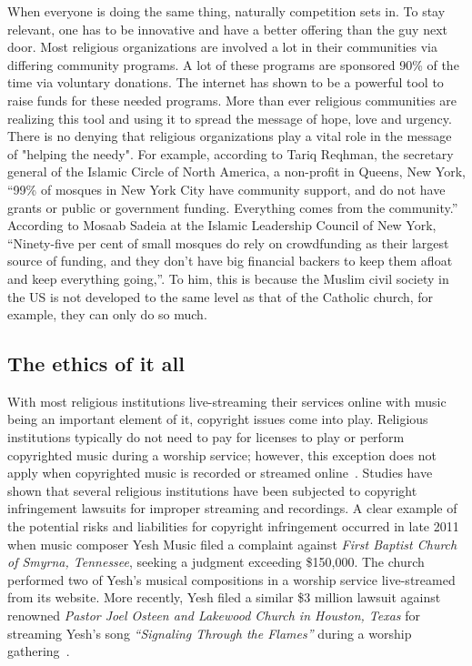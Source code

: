 When everyone is doing the same thing, naturally competition sets in. To stay relevant, one has to be innovative and have a better offering than the guy next door. Most religious organizations are involved a lot in their communities via differing community programs. A lot of these programs are sponsored 90\% of the time via voluntary donations. The internet has shown to be a powerful tool to raise funds for these needed programs. More than ever religious communities are realizing this tool and using it to spread the message of hope, love and urgency. There is no denying that religious organizations play a vital role in the message of "helping the needy". For example, according to Tariq Reqhman, the secretary general of the Islamic Circle of North America, a non-profit in Queens, New York, “99\% of mosques in New York City have community support, and do not have grants or public or government funding. Everything comes from the community.”~\cite{mulvey} According to Mosaab Sadeia at the Islamic Leadership Council of New York, “Ninety-five per cent of small mosques do rely on crowdfunding as their largest source of funding, and they don’t have big financial backers to keep them afloat and keep everything going,”. To him, this is because the Muslim civil society in the US is not developed to the same level as that of the Catholic church, for example, they can only do so much.

\subsection{The ethics of it all}
With most religious institutions live-streaming their services online with music being an important element of it, copyright issues come into play. Religious institutions typically do not need to pay for licenses to play or perform copyrighted music during a worship service; however, this exception does not apply when copyrighted music is recorded or streamed online~\cite{dickson}. Studies have shown that several religious institutions have been subjected to copyright infringement lawsuits for improper streaming and recordings. A clear example of the potential risks and liabilities for copyright infringement occurred in late 2011 when music composer Yesh Music filed a complaint against \textit{First Baptist Church of Smyrna, Tennessee}, seeking a judgment exceeding \$150,000. The church performed two of Yesh’s musical compositions in a worship service live-streamed from its website. More recently, Yesh filed a similar \$3 million lawsuit against renowned \textit{Pastor Joel Osteen and Lakewood Church in Houston, Texas} for streaming Yesh’s song \textit{“Signaling Through the Flames”} during a worship gathering~\cite{dickson}.

